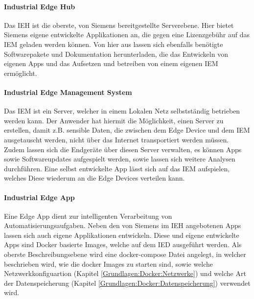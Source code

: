 			
		\paragraph{Industrial Edge Hub}
			Das \gls{IEH} ist die oberste, von Siemens bereitgestellte Serverebene.
			Hier bietet Siemens eigene entwickelte Applikationen an, die gegen eine Lizenzgebühr auf das \gls{IEM} geladen werden können.
			Von hier aus lassen sich ebenfalls benötigte Softwarepakete und Dokumentation herunterladen, die das Entwickeln von eigenen Apps und das Aufsetzen und betreiben von einem eigenen \gls{IEM} ermöglicht. \cite{siemensIEM_gettingStarted}
			
		\paragraph{Industrial Edge Management System}
			Das \gls{IEM} ist ein Server, welcher in einem Lokalen Netz selbstständig betrieben werden kann.
			Der Anwender hat hiermit die Möglichkeit, einen Server zu erstellen, damit z.B. sensible Daten, die zwischen dem Edge Device und dem \gls{IEM} ausgetauscht werden, nicht über das Internet transportiert werden müssen.
			Zudem lassen sich die Endgeräte über diesen Server verwalten, es können Apps sowie Softwareupdates aufgespielt werden, sowie lassen sich weitere Analysen durchführen.
			Eine selbst entwickelte App lässt sich auf das \gls{IEM} aufspielen, welches Diese wiederum an die Edge Devices verteilen kann.
			\cite{siemensIEM_gettingStarted}
			
		\paragraph{Industrial Edge App}
			Eine Edge App dient zur intelligenten Verarbeitung von Automatisierungsaufgaben. \cite{siemensIEM_gettingStarted}
			Neben den von Siemens im \gls{IEH} angebotenen Apps lassen sich auch eigene Applikationen entwickeln.
			Diese und eigene entwickelte Apps sind Docker basierte Images, welche auf dem \gls{IED} ausgeführt werden.
			Als oberste Beschreibungsebene wird eine docker-compose Datei angelegt, in welcher beschrieben wird, wie die docker Images zu starten sind, sowie welche Netzwerkkonfiguartion (Kapitel \ref{Grundlagen:Docker:Netzwerke}) und welche Art der Datenspeicherung (Kapitel \ref{Grundlagen:Docker:Datenspeicherung}) verwendet wird.
	
